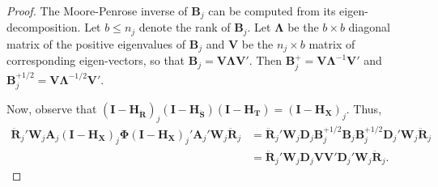 \documentclass[12pt]{article}
\newcommand{\bm}{\mathbf}
\newcommand{\bs}{\boldsymbol}
\begin{document}
\begin{proof}
The Moore-Penrose inverse of $\bm{B}_j$ can be computed from its eigen-decomposition. Let $b \leq n_j$ denote the rank of $\bm{B}_j$. 
Let $\bs\Lambda$ be the $b \times b$ diagonal matrix of the positive eigenvalues of $\bm{B}_j$ and $\bm{V}$ be the $n_j \times b$ matrix of corresponding eigen-vectors, so that $\bm{B}_j = \bm{V}\bs\Lambda\bm{V}'$. 
Then $\bm{B}_j^+ = \bm{V}\bs\Lambda^{-1}\bm{V}'$ and $\bm{B}_j^{+1/2} = \bm{V}\bs\Lambda^{-1/2}\bm{V}'$.

Now, observe that $\left(\bm{I} - \bm{H_{\ddot{R}}}\right)_j \left(\bm{I} - \bm{H_{\ddot{S}}}\right) \left(\bm{I} - \bm{H_T}\right) = \left(\bm{I} - \bm{H_X}\right)_j$. Thus, 
\begin{align}
\label{eq:step1}
\bm{\ddot{R}}_j' \bm{W}_j \bm{A}_j \left(\bm{I} - \bm{H_X}\right)_j \bs\Phi \left(\bm{I} - \bm{H_X}\right)_j' \bm{A}_j' \bm{W}_j \bm{\ddot{R}}_j &= \bm{\ddot{R}}_j' \bm{W}_j \bm{D}_j \bm{B}_j^{+1/2} \bm{B}_j \bm{B}_j^{+1/2} \bm{D}_j' \bm{W}_j \bm{\ddot{R}}_j \nonumber \\
&= \bm{\ddot{R}}_j' \bm{W}_j \bm{D}_j \bm{V}\bm{V}' \bm{D}_j' \bm{W}_j \bm{\ddot{R}}_j. 
\end{align}


\end{proof}
\end{document}
